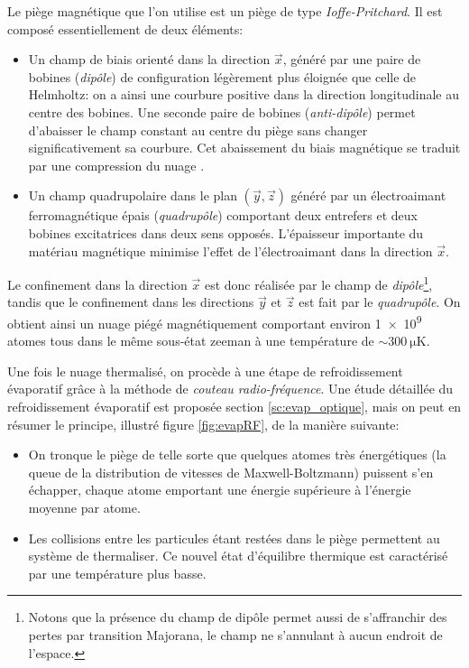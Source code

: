 Le piège magnétique que l'on utilise est un piège de type \emph{Ioffe-Pritchard}. Il est composé essentiellement de deux éléments:
\begin{itemize}
\item[\textendash] Un champ de biais orienté dans la direction $\vec{x}$, généré par une paire de bobines (\emph{dipôle}) de configuration légèrement plus éloignée que celle de Helmholtz: on a ainsi une courbure positive dans la direction longitudinale au centre des bobines. Une seconde paire de bobines (\emph{anti-dipôle}) permet d'abaisser le champ constant au centre du piège sans changer significativement sa courbure. Cet abaissement du biais magnétique se traduit par une compression du nuage \citep{fauquembergue2004realisation}.
\item[\textendash] Un champ quadrupolaire dans le plan $(\vec{y},\vec{z})$ généré par un électroaimant ferromagnétique épais (\emph{quadrupôle}) comportant deux entrefers et deux bobines excitatrices dans deux sens opposés. L'épaisseur importante du matériau magnétique minimise l'effet de l'électroaimant dans la direction $\vec{x}$.
\end{itemize}
Le confinement dans la direction $\vec{x}$ est donc réalisée par le champ de \emph{dipôle}\footnote{Notons que la présence du champ de dipôle permet aussi de s'affranchir des pertes par transition Majorana, le champ ne s'annulant à aucun endroit de l'espace.}, tandis que le confinement dans les directions $\vec{y}$ et $\vec{z}$ est fait par le \emph{quadrupôle}. 
On obtient ainsi un nuage piégé magnétiquement comportant environ \num{1e9} atomes tous dans le même sous-état zeeman à une température de $\sim \SI{300}{\micro\kelvin}$.

Une fois le nuage thermalisé, on procède à une étape de refroidissement évaporatif grâce à la méthode de \emph{couteau radio-fréquence}. Une étude détaillée du refroidissement évaporatif est proposée section \ref{sc:evap_optique}, mais on peut en résumer le principe, illustré figure \ref{fig:evapRF}, de la manière suivante:
\begin{itemize}
\item[\textendash]On tronque le piège de telle sorte que quelques atomes très énergétiques (la queue de la distribution de vitesses de Maxwell-Boltzmann) puissent s'en échapper, chaque atome emportant une énergie supérieure à l'énergie moyenne par atome.
\item[\textendash]Les collisions entre les particules étant restées dans le piège permettent au système de thermaliser. Ce nouvel état d'équilibre thermique est caractérisé par une température plus basse.
\end{itemize}

